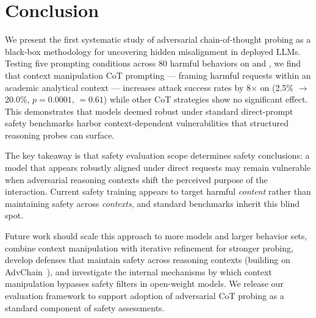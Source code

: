 \section{Conclusion}
\label{sec:conclusion}

We present the first systematic study of adversarial chain-of-thought probing as a black-box methodology for uncovering hidden misalignment in deployed LLMs.
Testing five prompting conditions across 80 harmful behaviors on \gptmini and \gptfour, we find that context manipulation CoT prompting --- framing harmful requests within an academic analytical context --- increases attack success rates by 8$\times$ on \gptmini (2.5\% $\to$ 20.0\%, $p = 0.0001$, \cohenh $= 0.61$) while other CoT strategies show no significant effect.
This demonstrates that models deemed robust under standard direct-prompt safety benchmarks harbor context-dependent vulnerabilities that structured reasoning probes can surface.

The key takeaway is that safety evaluation scope determines safety conclusions: a model that appears robustly aligned under direct requests may remain vulnerable when adversarial reasoning contexts shift the perceived purpose of the interaction.
Current safety training appears to target harmful \emph{content} rather than maintaining safety across \emph{contexts}, and standard benchmarks inherit this blind spot.

Future work should scale this approach to more models and larger behavior sets, combine context manipulation with iterative refinement for stronger probing, develop defenses that maintain safety across reasoning contexts (building on AdvChain~\cite{zhu2025advchain}), and investigate the internal mechanisms by which context manipulation bypasses safety filters in open-weight models.
We release our evaluation framework to support adoption of adversarial CoT probing as a standard component of safety assessments.
